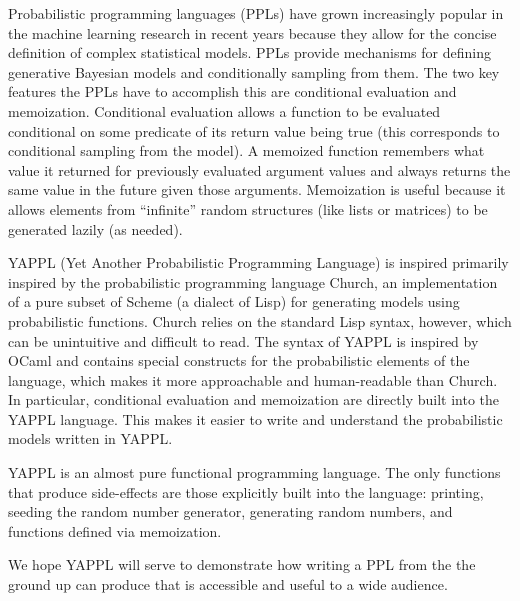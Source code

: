 Probabilistic programming languages (PPLs) have grown increasingly popular in the machine learning research in recent years because they allow for the concise definition of complex statistical models. PPLs provide mechanisms for defining generative Bayesian models and conditionally sampling from them. The two key features the PPLs have to accomplish this are conditional evaluation and memoization. Conditional evaluation allows a function to be evaluated conditional on some predicate of its return value being true (this corresponds to conditional sampling from the model). A memoized function remembers what value it returned for previously evaluated argument values and always returns the same value in the future given those arguments. Memoization is useful because it allows elements from ``infinite'' random structures (like lists or matrices) to be generated lazily (as needed). 

YAPPL (Yet Another Probabilistic Programming Language) is inspired primarily inspired by the probabilistic programming language Church, an implementation of a pure subset of Scheme (a dialect of Lisp) for generating models using probabilistic functions. Church relies on the standard Lisp syntax, however, which can be unintuitive and difficult to read. The syntax of YAPPL is inspired by OCaml and contains special constructs for the probabilistic elements of the language, which makes it more approachable and human-readable than Church. In particular, conditional evaluation and memoization are directly built into the YAPPL language. This makes it easier to write and understand the probabilistic models written in YAPPL. 

YAPPL is an almost pure functional programming language. The only functions that produce side-effects are those explicitly built into the language: printing, seeding the random number generator, generating random numbers, and functions defined via memoization. 

We hope YAPPL will serve to demonstrate how writing a PPL from the the ground up can produce that is accessible and useful to a wide audience. 
 

